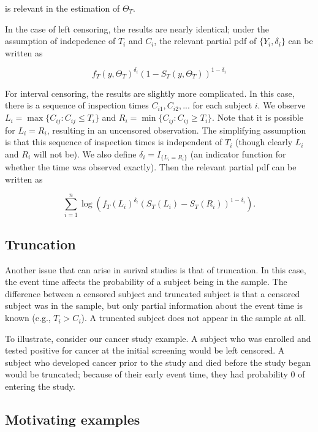 \documentclass[a4paper]{article}
\begin{document}
is relevant in the estimation of $\Theta_T$. 

  In the case of left censoring, the results are nearly identical; under the assumption of indepedence of $T_i$ and $C_i$, the relevant partial pdf of $\{Y_i, \delta_i\}$ can be written as 
  
  \[
  f_T(y, \Theta_T)^{\delta_i} (1-S_T(y, \Theta_T))^{1-\delta_i}
  \]
  
  For interval censoring, the results are slightly more complicated. In this case, there is a sequence of inspection times $C_{i1}, C_{i2}, ...$ for each subject $i$. We observe $L_i = \max\{C_{ij}: C_{ij} \leq T_i\}$ and $R_i = \min \{C_{ij}: C_{ij} \geq T_i\}$. Note that it is possible for $L_i = R_i$, resulting in an uncensored observation. The simplifying assumption is that this sequence of inspection times is independent of $T_i$ (though clearly $L_i$ and $R_i$ will not be). We also define $\delta_i = I_{\{L_i = R_i\}}$ (an indicator function for whether the time was observed exactly). Then the relevant partial pdf can be written as 
  
  \begin{equation}
  \displaystyle \sum_{i = 1}^n \log \left( f_T(L_i) ^ {\delta_i} (S_T(L_i) - S_T(R_i)) ^ {1 -\delta_i} \right). 
  \end{equation}
  \label{eq:ic_llk}
  \subsection{Truncation}
  
  Another issue that can arise in surival studies is that of truncation. In this case, the event time affects the probability of a subject being in the sample. The difference between a censored subject and truncated subject is that a censored subject was in the sample, but only partial information about the event time is known (e.g., $T_i > C_i$). A truncated subject does not appear in the sample at all. 
  
  To illustrate, consider our cancer study example. A subject who was enrolled and tested positive for cancer at the initial screening would be left censored. A subject who developed cancer prior to the study and died before the study began would be truncated; because of their early event time, they had probability 0 of entering the study. 

  \subsection{Motivating examples}
    
\end{document}
